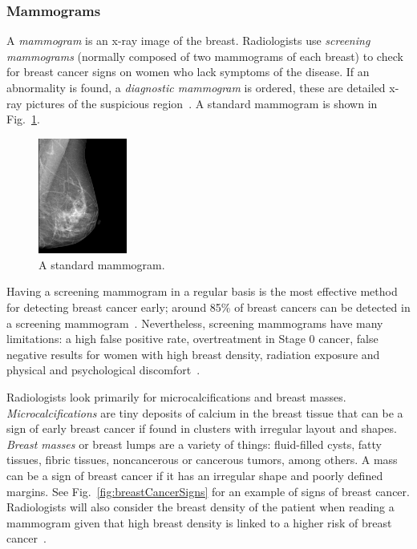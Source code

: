 \subsubsection{Mammograms}
A \emph{mammogram} is an x-ray image of the breast. Radiologists use \emph{screening mammograms} (normally composed of two mammograms of each breast) to check for breast cancer signs on women who lack symptoms of the disease. If an abnormality is found, a \emph{diagnostic mammogram} is ordered, these are detailed x-ray pictures of the suspicious region~\cite{Mammograms2014}. A standard mammogram is shown in Fig.~\ref{fig:normalMammogram}.

\begin{figure}[h]
	\centering
	\includegraphics[width = 0.26\textwidth]{plots/normalMammogram.jpg}
	\caption[A digital mammogram]{A standard mammogram.}
	\label{fig:normalMammogram}
\end{figure}

Having a screening mammogram in a regular basis is the most effective method for detecting breast cancer early; around 85\% of breast cancers can be detected in a screening mammogram~\cite{PerformanceMammography2013}. Nevertheless, screening mammograms have many limitations: a high false positive rate, overtreatment in Stage 0 cancer, false negative results for women with high breast density, radiation exposure and physical and psychological discomfort~\cite{Mammograms2014}.

Radiologists look primarily for microcalcifications and breast masses. \emph{Microcalcifications} are tiny deposits of calcium in the breast tissue that can be a sign of early breast cancer if found in clusters with irregular layout and shapes. \emph{Breast masses} or breast lumps are a variety of things: fluid-filled cysts, fatty tissues, fibric tissues, noncancerous or cancerous tumors, among others. A mass can be a sign of breast cancer if it has an irregular shape and poorly defined margins. See Fig.~\ref{fig:breastCancerSigns} for an example of signs of breast cancer. Radiologists will also consider the breast density of the patient when reading a mammogram given that high breast density is linked to a higher risk of breast cancer~\cite{MammogramsACS2014}.

